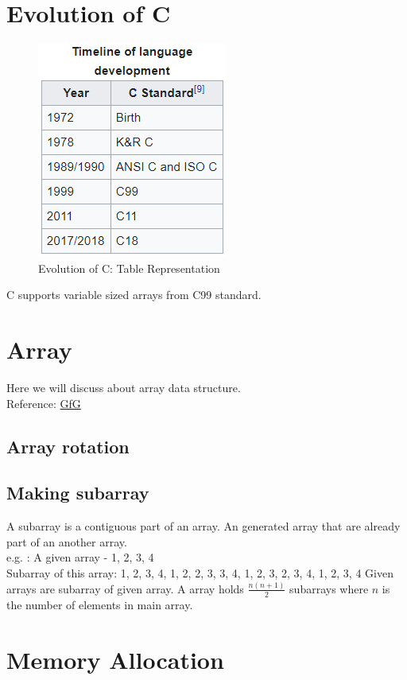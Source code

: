 \section{Evolution of C}
\begin{figure}[hbtp]
\centering
\includegraphics[width=200 px]{Source Images/Timeline of C language.png}
\caption{Evolution of C: Table Representation}
\end{figure}
C supports variable sized arrays from C99 standard.

\section{Array}
Here we will discuss about array data structure.\\
Reference: \href{https://www.geeksforgeeks.org/array-data-structure/}{GfG}\\

\subsection{Array rotation}
\subsection{Making subarray}
A subarray is a contiguous part of an array. An generated array that are already part of an another array.\\
e.g. : A given array - {1, 2, 3, 4}\\
Subarray of this array:
{1}, {2}, {3}, {4}, {1, 2}, {2, 3}, {3, 4}, {1, 2, 3}, {2, 3, 4}, {1, 2, 3, 4}
Given arrays are subarray of given array. A array holds $\frac{n(n+1)}{2}$ subarrays where $n$ is the number of elements in main array.

\section{Memory Allocation}
